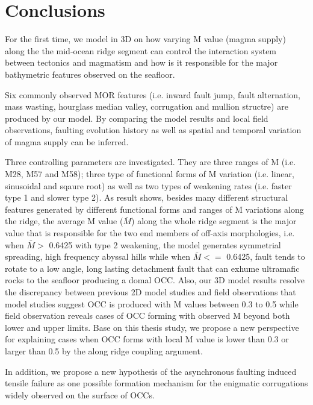 \pagebreak
\section{Conclusions}
For the first time, we model in 3D on how varying M value (magma supply) along the the mid-ocean ridge segment can control the interaction system between tectonics and magmatism and how is it responsible for the major bathymetric features observed on the seafloor.

Six commonly observed MOR features (i.e. inward fault jump, fault alternation, mass wasting, hourglass median valley, corrugation and mullion structre) are produced by our model. By comparing the model results and local field observations, faulting evolution history as well as spatial and temporal variation of magma supply can be inferred.

Three controlling parameters are investigated. They are three ranges of M (i.e. M28, M57 and M58); three type of functional forms of M variation (i.e. linear, sinusoidal and sqaure root) as well as two types of weakening rates (i.e. faster type 1 and slower type 2). As result shows, besides many different structural features generated by different functional forms and ranges of M variations along the ridge, the average M value ($\bar{M}$) along the whole ridge segment is the major value that is responsible for the two end members of off-axis morphologies, i.e. when $\bar{M} >$ 0.6425 with type 2 weakening, the model generates symmetrial spreading, high frequency abyssal hills while when $\bar{M} <=$ 0.6425, fault tends to rotate to a low angle, long lasting detachment fault that can exhume ultramafic rocks to the seafloor producing a domal OCC. Also, our 3D model results resolve the discrepancy between previous 2D model studies and field observations that model studies suggest OCC is produced with M values between 0.3 to 0.5 while field observation reveals cases of OCC forming with observed M beyond both lower and upper limits. Base on this thesis study, we propose a new perspective for explaining cases when OCC forms with local M value is lower than 0.3 or larger than 0.5 by the along ridge coupling argument.

In addition, we propose a new hypothesis of the asynchronous faulting induced tensile failure as one possible formation mechanism for the enigmatic corrugations widely observed on the surface of OCCs.




